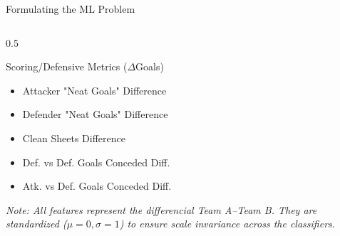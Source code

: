 \documentclass[10pt, aspectratio=169]{beamer}
\begin{document}
\begin{frame}{Formulating the ML Problem}
\begin{columns}[T]
        \begin{column}{0.5\textwidth}
            \begin{block}{Scoring/Defensive Metrics ($\Delta$Goals)}
                \begin{itemize}
                    \item Attacker "Neat Goals" Difference
                    \item Defender "Neat Goals" Difference
                    \item Clean Sheets Difference
                    \item Def. vs Def. Goals Conceded Diff.
                    \item Atk. vs Def. Goals Conceded Diff.
                \end{itemize}
            \end{block}
		    \vspace{1em}
		    \textit{\small Note: All features represent the differencial {Team A--Team B}. They are standardized ($\mu=0, \sigma=1$) to ensure scale invariance across the classifiers.}
        \end{column}
    \end{columns}

\end{frame}
\end{document}
